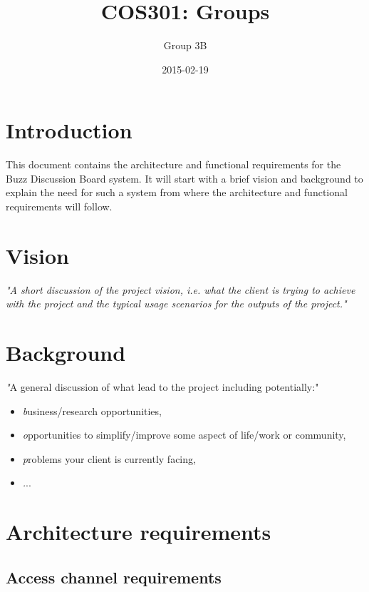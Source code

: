\documentclass[a4paper, 12pt, oneside]{article}
\title{COS301: Groups}
\date{2015-02-19}
\author{Group 3B}
\begin{document}
\maketitle
{}

\newpage
{}
\tableofcontents

\newpage
{}


\section{Introduction}

This document contains the architecture and functional requirements for the Buzz Discussion Board system. It will start with a brief  vision and background to explain the need for such a system from where the architecture and functional requirements will follow.

\section{Vision}

\textit{"A short discussion of the project vision, i.e. what the client is trying to achieve with the project
and the typical usage scenarios for the outputs of the project."}

\section{Background}

\textit "A general discussion of what lead to the project including potentially:"

\begin{itemize}
\item \textit business/research opportunities,
\item \textit opportunities to simplify/improve some aspect of life/work or community,
\item \textit problems your client is currently facing,
\item \textit ...
\end{itemize}

\section{Architecture requirements}

	\subsection{Access channel requirements}
\end{document}
